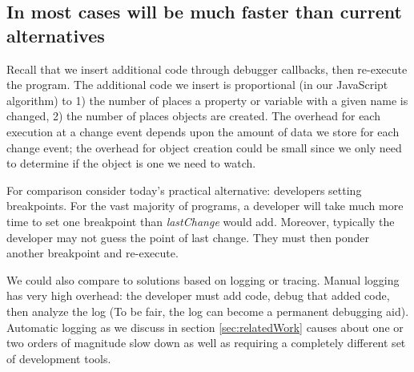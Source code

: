 \documentclass{sig-alternate}
\begin{document}
\subsection{In most cases  will be much faster than current alternatives}


Recall that we
insert additional code through debugger callbacks, then re-execute the
program. The additional code we insert is proportional (in our
JavaScript algorithm) to 1) the number of places a property or
variable with a given name is changed, 2) the number of places objects
are created. The overhead for each execution at a change event
 depends upon the amount of data we store for each change event; 
the overhead for object creation could be small since we only need to 
determine if the object is one we need to watch.  


For comparison consider today's practical alternative: developers
setting breakpoints. For the vast majority of programs, a developer
will take much more time to set one breakpoint than
\textit{lastChange} would add. Moreover, typically the developer may not
guess the point of last change. They must then ponder another
breakpoint and re-execute. 


We could also compare to solutions based on logging or tracing. Manual
logging has very high overhead: the developer must add code, debug
that added code, then analyze the log (To be fair, the log can become
a permanent debugging aid). Automatic logging as we discuss in 
section \ref{sec:relatedWork} causes about one or two orders of magnitude slow down as well
as requiring a completely different set of development tools. 
\end{document}
